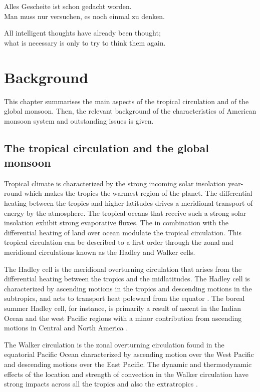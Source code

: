 \begin{savequote}[8cm]
Alles Gescheite ist schon gedacht worden.\\
Man muss nur versuchen, es noch einmal zu denken.

All intelligent thoughts have already been thought;\\
what is necessary is only to try to think them again.
\end{savequote}

\chapter{\label{ch:2-litreview}Background}

\minitoc
 This chapter summarises the main aspects of the tropical circulation and of the global monsoon. Then, the relevant background of the characteristics of American monsoon system and outstanding issues is given. 
\section{The tropical circulation and the global monsoon}\label{sq:bk_tropics}

Tropical climate is characterized by the strong incoming solar insolation year-round which makes the tropics the warmest region of the planet. 
The differential heating between the tropics and higher latitudes drives  a meridional transport of energy by the atmosphere. 
The tropical oceans that receive such a strong solar insolation exhibit strong evaporative fluxes. The in combination with the differential heating of land over ocean modulate the tropical circulation. %
This tropical circulation can be described to a first order through the zonal and meridional circulations known as the Hadley and Walker cells. 
 
The Hadley cell is the meridional overturning circulation that arises from the differential heating between the tropics and the midlatitudes. The Hadley cell is characterized by ascending motions in the tropics and descending motions in the subtropics, and acts to transport heat poleward from the equator \citep{lorenz1967}.  
The boreal summer Hadley cell, for instance,  is primarily a result of ascent in the Indian Ocean and the west Pacific regions with a minor contribution from ascending motions in Central and North America \citep{hoskins2020}. 

The Walker circulation is the zonal overturning circulation found in the equatorial Pacific Ocean characterized by ascending motion over the West Pacific and descending motions over the East Pacific\citep{bjerknes1969,gill1980}. The dynamic and thermodynamic effects of the location and strength of convection in the Walker circulation have strong impacts across all the tropics and also the extratropics \citep{cai2019pantropical}.


